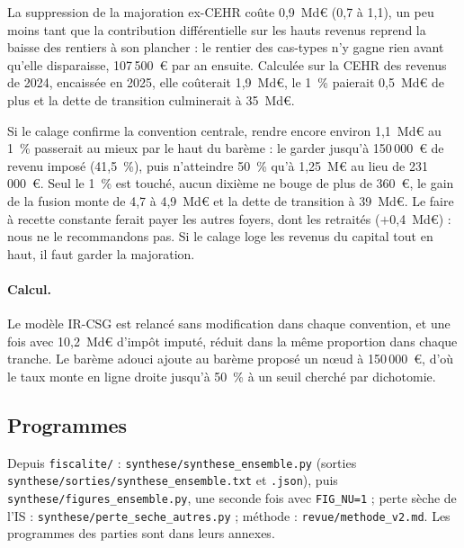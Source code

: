 \documentclass[11pt,a4paper]{article}
\begin{document}
La suppression de la majoration ex-CEHR coûte 0,9~Md€ (0,7 à 1,1), un peu moins tant que la contribution
différentielle sur les hauts revenus reprend la baisse des rentiers à son plancher : le rentier des cas-types n'y gagne
rien avant qu'elle disparaisse, 107\,500~€ par an ensuite. Calculée sur la CEHR des revenus de 2024, encaissée en
2025, elle coûterait 1,9~Md€, le 1~\% paierait 0,5~Md€ de plus et la dette de transition culminerait à 35~Md€.

Si le calage confirme la convention centrale, rendre encore environ 1,1~Md€ au 1~\% passerait au mieux par le haut du
barème : le garder jusqu'à 150\,000~€ de revenu imposé (41,5~\%), puis n'atteindre 50~\% qu'à 1,25~M€ au lieu de
231\,000~€. Seul le 1~\% est touché, aucun dixième ne bouge de plus de 360~€, le gain de la fusion monte de 4,7 à
4,9~Md€ et la dette de transition à 39~Md€. Le faire à recette constante ferait payer les autres foyers, dont les
retraités ($+$0,4~Md€) : nous ne le recommandons pas. Si le calage loge les revenus du capital tout en haut, il faut
garder la majoration.

\paragraph{Calcul.} Le modèle IR-CSG est relancé sans modification dans chaque convention, et une fois avec 10,2~Md€
d'impôt imputé, réduit dans la même proportion dans chaque tranche. Le barème adouci ajoute au barème proposé un nœud à
150\,000~€, d'où le taux monte en ligne droite jusqu'à 50~\% à un seuil cherché par dichotomie.

\subsection{Programmes}\label{ann:meth_programmes}

{\small\raggedright Depuis \texttt{fiscalite/} : \texttt{synthese/synthese\_ensemble.py} (sorties
\texttt{synthese/sorties/synthese\_ensemble.txt} et \texttt{.json}), puis \texttt{synthese/figures\_ensemble.py}, une
seconde fois avec \texttt{FIG\_NU=1} ; perte sèche de l'IS : \texttt{synthese/perte\_seche\_autres.py} ; méthode :
\texttt{revue/methode\_v2.md}. Les programmes des parties sont dans leurs annexes.\par}
\end{document}
